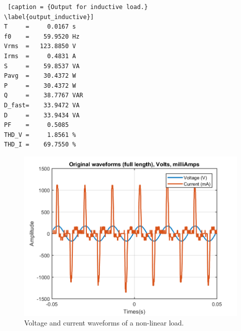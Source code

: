 \documentclass[journal]{IEEEtran}
\begin{document}
\begin{lstlisting} [caption = {Output for inductive load.}
\label{output_inductive}]
T     =     0.0167 s 
f0    =    59.9520 Hz 
Vrms  =   123.8850 V
Irms  =     0.4831 A
S     =    59.8537 VA
Pavg  =    30.4372 W 
P     =    30.4372 W 
Q     =    38.7767 VAR 
D_fast=    33.9472 VA 
D     =    33.9434 VA 
PF    =     0.5085 
THD_V =     1.8561 %
THD_I =    69.7550 %
\end{lstlisting}


\begin{figure}[h]
\centering
\includegraphics[clip,width=\columnwidth]
{original_waveform_computer.png}
\caption{Voltage and current waveforms of a non-linear load.}
\label{original_no_lineal_load}
\end{figure}
\end{document}
